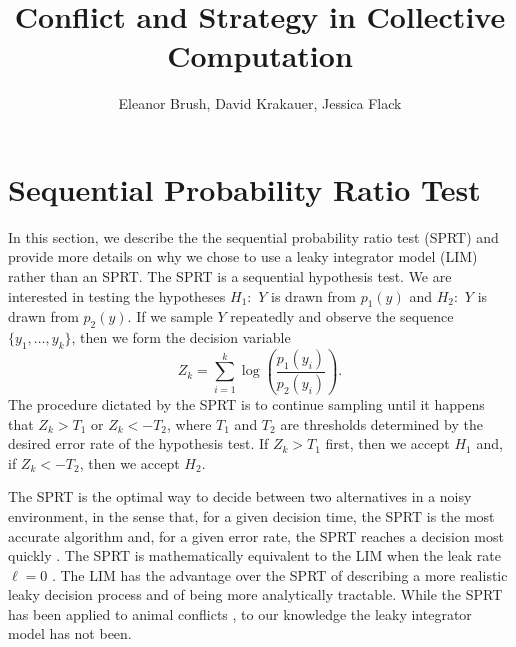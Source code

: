 \documentclass{article}
\title{Conflict and Strategy in Collective Computation}
\author{Eleanor Brush, David Krakauer, Jessica Flack}
\begin{document}
\maketitle
\tableofcontents


\section{Sequential Probability Ratio Test \label{SPRT}}

In this section, we describe the the sequential probability ratio test (SPRT) and provide more details on why we chose to use a leaky integrator model (LIM) rather than an SPRT. The SPRT is a sequential hypothesis test. We are interested in testing the hypotheses $H_1:$ $Y$ is drawn from $p_1(y)$ and $H_2:$ $Y$ is drawn from $p_2(y)$. If we sample $Y$ repeatedly and observe the sequence $\{y_1,\dots,y_k\}$, then we form the decision variable $$Z_k=\sum_{i=1}^k\log\left(\frac{p_1(y_i)}{p_2(y_i)}\right).$$ The procedure dictated by the SPRT is to continue sampling until it happens that $Z_k>T_1$ or $Z_k<-T_2$, where $T_1$ and $T_2$ are thresholds determined by the desired error rate of the hypothesis test. If $Z_k>T_1$ first, then we accept $H_1$ and, if $Z_k<-T_2$, then we accept $H_2$.


The SPRT is the optimal way to decide between two alternatives in a noisy environment, in the sense that, for a given decision time, the SPRT is the most accurate algorithm and, for a given error rate, the SPRT reaches a decision most quickly \cite{Bogacz:2006uq,Froment:2010fk}.  The SPRT is mathematically equivalent to the LIM when the leak rate $\ell=0$ \cite{Bogacz:2006uq}. The LIM has the advantage over the SPRT of describing a more realistic leaky decision process and of being more analytically tractable.  While the SPRT has been applied to animal conflicts  \cite{Froment:2010fk}, to our knowledge the leaky integrator model has not been.
\end{document}
